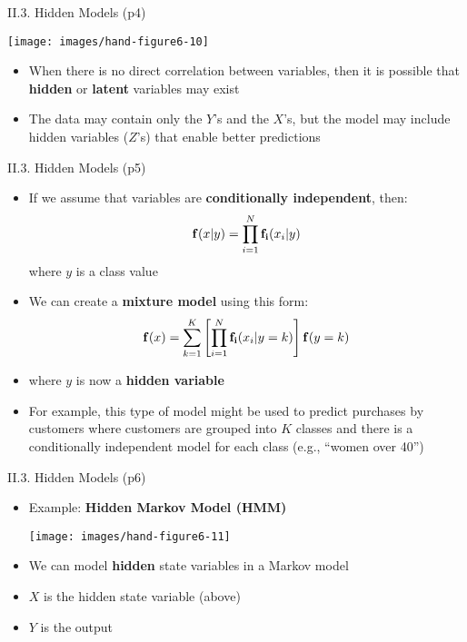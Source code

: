\documentclass[handout]{beamer}
\newcommand{\strong}[1]{\textbf{\color{teal} #1}}
\newcommand{\stronger}[1]{\textbf{\color{purple} #1}}
\begin{document}
\begin{frame}{II.3. Hidden Models (p4)}
\begin{center}
\texttt{[image: images/hand-figure6-10]}\\
\cite[Figure 6.10]{hand-et-al:2001}
\end{center}
\begin{itemize}
\item When there is no direct correlation between variables, then it is possible that \strong{hidden} or \strong{latent} variables may exist
\item The data may contain only the $Y$'s and the $X$'s, but the model may include hidden variables ($Z$'s) that enable better predictions
\end{itemize}
\end{frame}
\begin{frame}{II.3. Hidden Models (p5)}
\begin{itemize}
\item If we assume that variables are \strong{conditionally independent}, then:
\[
{\bf f}(x|y) = \prod_{i=1}^{N}{{\bf f_i}(x_i|y)}
\]
where $y$ is a class value
\item We can create a \strong{mixture model} using this form:
\[
{\bf f}(x) = \sum_{k=1}^{K} \left[ \prod_{i=1}^{N}{{\bf f_i}(x_i|y=k)} \right] {\bf f}(y=k)
\]
\item[] where $y$ is now a \stronger{hidden variable}
\item For example, this type of model might be used to predict purchases by customers where customers are grouped into $K$ classes and there is a conditionally independent model for each class (e.g., ``women over 40'')
\end{itemize}
\end{frame}
\begin{frame}{II.3. Hidden Models (p6)} 
\begin{itemize}
\item Example: \stronger{Hidden Markov Model (HMM)}
\begin{center}
\texttt{[image: images/hand-figure6-11]}\\
\cite[Figure 6.11]{hand-et-al:2001}
\end{center}
\item We can model \strong{hidden} state variables in a Markov model
\item $X$ is the hidden state variable (above)
\item $Y$ is the output
\end{itemize}
\end{frame}
\end{document}
